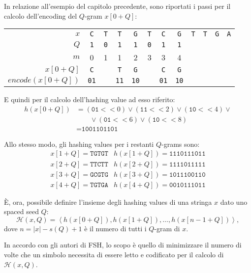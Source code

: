 \begin{example}
	In relazione all'esempio del capitolo precedente, sono riportati i passi per il calcolo dell'encoding del $Q$-gram $x[0 + Q]$:
	
	{
		\centering
		\begin{tabular}{r | ccccccccccc}
			$x$ & \texttt{C} & \texttt{T} & \texttt{T} & \texttt{G} & \texttt{T} & \texttt{C} & \texttt{G} & \texttt{T} & \texttt{T} & \texttt{G} & \texttt{A} \\
			$Q$ & \texttt{1} & \texttt{0} & \texttt{1} & \texttt{1} & \texttt{0} & \texttt{1} & \texttt{1} \\
			$m$ & 0 & 1 & 1 & 2 & 3 & 3 & 4 \\
			$x[0 + Q]$ & \texttt{C} & & \texttt{T} & \texttt{G} & & \texttt{C} & \texttt{G} \\
			$encode(x[0 + Q])$ & \texttt{01} & & \texttt{11} & \texttt{10} & & \texttt{01} & \texttt{10} 
		\end{tabular}
		
	}

	E quindi per il calcolo dell'hashing value ad esso riferito:
	\begin{align*}
		h\left( x[0 + Q] \right) &= (\texttt{01} <\!< 0) \vee (\texttt{11} <\!< 2) \vee (\texttt{10} <\!< 4) \vee {} \\
		&\qquad {} \vee (\texttt{01} <\!< 6) \vee (\texttt{10} <\!< 8)\\
		&= \texttt{1001101101} 
	\end{align*}
	
	Allo stesso modo, gli hashing values per i restanti $Q$-grams sono: \[ \begin{matrix}
		x[1 + Q] = \texttt{TGTGT} & h(x[1 + Q]) = \texttt{1110111011} \\
		x[2 + Q] = \texttt{TTCTT} & h(x[2 + Q]) = \texttt{1111011111} \\
		x[3 + Q] = \texttt{GCGTG} & h(x[3 + Q]) = \texttt{1011100110} \\
		x[4 + Q] = \texttt{TGTGA} & h(x[4 + Q]) = \texttt{0010111011}
	\end{matrix} \]
\end{example}

È, ora, possibile definire l'insieme degli hashing values di una stringa $x$ dato uno spaced seed $Q$: \[ \mathcal{H}(x, Q) = \left\langle h(x[0 + Q]), h(x[1 + Q]), \dots, h(x[n - 1 + Q]) \right\rangle, \] dove $n = |x| - s(Q) + 1$ è il numero di tutti i $Q$-gram di $x$.

In accordo con gli autori di \acs{FSH}, lo scopo è quello di minimizzare il numero di volte che un simbolo necessita di essere letto e codificato per il calcolo di $\mathcal{H}(x, Q)$.


